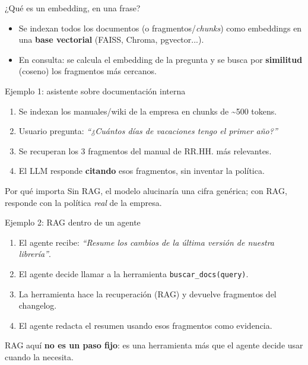 \begin{frame}{¿Qué es un embedding, en una frase?}
  \vfill
  \begin{itemize}
    \item Se indexan todos los documentos (o fragmentos/\emph{chunks}) como
      embeddings en una \textbf{base vectorial} (FAISS, Chroma, pgvector...).
    \item En consulta: se calcula el embedding de la pregunta y se busca por
      \textbf{similitud} (coseno) los fragmentos más cercanos.
  \end{itemize}
\end{frame}

\begin{frame}{Ejemplo 1: asistente sobre documentación interna}
  \small
  \begin{enumerate}
    \item Se indexan los manuales/wiki de la empresa en chunks de \textasciitilde500 tokens.
    \item Usuario pregunta: \emph{``¿Cuántos días de vacaciones tengo el primer año?''}
    \item Se recuperan los 3 fragmentos del manual de RR.HH. más relevantes.
    \item El LLM responde \textbf{citando} esos fragmentos, sin inventar la política.
  \end{enumerate}
  \vfill
  \begin{alertblock}{Por qué importa}
    Sin RAG, el modelo alucinaría una cifra genérica; con RAG, responde con
    la política \emph{real} de la empresa.
  \end{alertblock}
\end{frame}

\begin{frame}{Ejemplo 2: RAG dentro de un agente}
  \small
  \begin{enumerate}
    \item El agente recibe: \emph{``Resume los cambios de la última versión
      de nuestra librería''}.
    \item El agente decide llamar a la herramienta \texttt{buscar\_docs(query)}.
    \item La herramienta hace la recuperación (RAG) y devuelve fragmentos del changelog.
    \item El agente redacta el resumen usando esos fragmentos como evidencia.
  \end{enumerate}
  \vfill
  RAG aquí \textbf{no es un paso fijo}: es una herramienta más que el agente
  decide usar cuando la necesita.
\end{frame}

